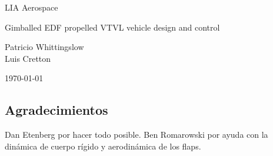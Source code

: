 \documentclass[11pt, titlepage]{article}
\author{Patricio Whittingslow \and Luis Cretton}
\begin{document}
\begin{titlepage}
	
	\centering
	{\small LIA Aerospace \par}
	
	
	\vspace{8cm}
	{\Huge Gimballed EDF propelled VTVL vehicle design and control  \par}
	\vspace{2cm}
	{ \large {
			Patricio Whittingslow \\ Luis Cretton 
		\par}}
	\vspace{4cm}
	\today
	
\end{titlepage}









\subsection*{Agradecimientos}
Dan Etenberg por hacer todo posible. Ben Romarowski por ayuda con la dinámica de cuerpo rígido y aerodinámica de los flaps.




% 
%
\end{document}
